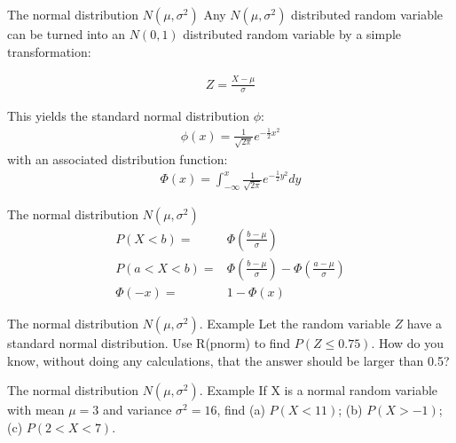 \documentclass{beamer}
\renewcommand{\P}[1]{P\left(#1\right)}
\begin{document}
\begin{frame}{The normal distribution $N(\mu,\sigma^2)$}
  Any $N (\mu, \sigma^2)$ distributed random variable can be turned into an
  $N(0,1)$ distributed random variable by a simple transformation:

  \begin{align*}
    Z=\frac{X-\mu}{\sigma}
  \end{align*}

  This yields the standard normal distribution $\phi$:
  \begin{align*}
    \phi (x) = \frac{1}{\sqrt{2\pi}}
    e^{-\frac{1}{2}{x}^2}
  \end{align*}
  with an associated distribution function:
  \begin{align*}
    \Phi (x) = \int_{-\infty}^x \frac{1}{\sqrt{2\pi}}
    e^{-\frac{1}{2}{y}^2}dy
  \end{align*}
\end{frame}

\begin{frame}{The normal distribution $N(\mu,\sigma^2)$}
  \begin{align*}
    P(X<b) =& \Phi\left(\frac{b-\mu}{\sigma}\right) \\
    P(a<X<b) =& \Phi\left(\frac{b-\mu}{\sigma}\right) -
                \Phi\left(\frac{a-\mu}{\sigma}\right)\\
    \Phi(-x) =& 1 - \Phi(x)
  \end{align*}
\end{frame}

\begin{frame}[t]{The normal distribution $N(\mu,\sigma^2)$. Example}
  Let the random variable $Z$ have a standard normal distribution. Use R(pnorm)
  to find $P(Z \leq 0.75)$. How do you know, without doing any calculations,
  that the answer should be larger than 0.5?
\end{frame}

\begin{frame}[t]{The normal distribution $N(\mu,\sigma^2)$. Example}
  If X is a normal random variable with mean $\mu = 3$ and variance
  $\sigma^2 = 16$, find (a) $\P{X < 11}$; (b) $\P{X > -1}$; (c) $\P{2 < X < 7}$.
\end{frame}
\end{document}

